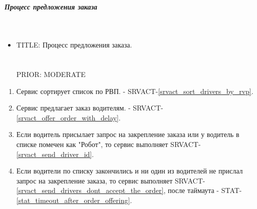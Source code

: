     \subparagraph{Процесс предложения заказа} \mbox{} \\

      \begin{itemize}

        \item {
          TITLE: Процесс предложения заказа.\\
          \\
          \\
          PRIOR: MODERATE\\
        }

      \end{itemize}

      \begin{alg} \label{alg_order_offering} \mbox{}

        \begin{enumerate}

          \item Сервис сортирует список по РВП. - SRVACT-\ref{srvact_sort_drivers_by_rvp}.

          \item Сервис предлагает заказ водителям. - SRVACT-\ref{srvact_offer_order_with_delay}.
          
          \item Если водитель присылает запрос на закрепление заказа или у водитель в списке помечен как "Робот", то сервис выполняет SRVACT-\ref{srvact_send_driver_id}. 

          \item Если водители по списку закончились и ни один из водителей не прислал запрос на закрепление заказа, то сервис выполняет SRVACT-\ref{srvact_send_drivers_dont_accept_the_order}, после таймаута - STAT-\ref{stat_timeout_after_order_offering}.

        \end{enumerate}

      \end{alg}

